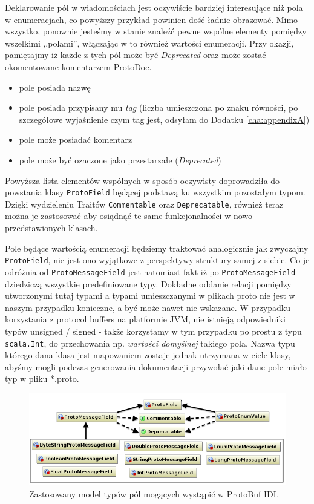 \documentclass[pdflatex,11pt]{aghdpl}
\begin{document}
Deklarowanie pól w wiadomościach jest oczywiście bardziej interesujące niż pola w enumeracjach, co powyższy przykład powinien dość ładnie obrazować.
Mimo wszystko, ponownie jesteśmy w stanie znaleźć pewne wspólne elementy pomiędzy wszelkimi ,,polami'', włączając w to również wartości enumeracji.
Przy okazji, pamiętajmy iż każde  z tych pól może być \textit{Deprecated} oraz może zostać okomentowane komentarzem ProtoDoc.

\begin{itemize}
 \item pole posiada nazwę
 \item pole posiada przypisany mu \textit{tag} (liczba umieszczona po znaku równości, po szczegółowe wyjaśnienie czym tag jest, odsyłam do Dodatku \ref{cha:appendixA})
 \item pole może posiadać komentarz
 \item pole może być ozaczone jako przestarzałe (\textit{Deprecated})
\end{itemize}

Powyższa lista elementów wspólnych w sposób oczywisty doprowadziła do powstania klasy \verb|ProtoField| będącej podstawą ku wszystkim pozostałym typom.
Dzięki wydzieleniu Traitów \verb|Commentable| oraz \verb|Deprecatable|, również teraz można je zastosować aby osiądnąć te same funkcjonalności w nowo przedstawionych klasach.

Pole będące wartością enumeracji będziemy traktować analogicznie jak zwyczajny \verb|ProtoField|, nie jest ono wyjątkowe z perspektywy struktury samej z siebie.
Co je odróżnia od \verb|ProtoMessageField| jest natomiast fakt iż po \verb|ProtoMessageField| dziedziczą wszystkie predefiniowane typy.
Dokładne oddanie relacji pomiędzy utworzonymi tutaj typami a typami umieszczanymi w plikach proto nie jest w naszym przypadku konieczne, a być może nawet nie wskazane.
W przypadku korzystania z protocol buffers na platformie JVM, nie istnieją odpowiedniki typów unsigned / signed - także korzystamy w tym przypadku po prostu z 
typu \verb|scala.Int|, do przechowania np. \textit{wartości domyślnej} takiego pola. Nazwa typu którego dana klasa jest mapowaniem zostaje jednak utrzymana w ciele klasy,
abyśmy mogli podczas generowania dokumentacji przywołać jaki dane pole miało typ w pliku *.proto.


\begin{figure}[ch]
\begin{center}
 \includegraphics[width=\textwidth]{fields_types}
\end{center}
\label{types_diagram}
\caption{Zastosowany model typów pól mogących wystąpić w ProtoBuf IDL}
\end{figure}
\end{document}
